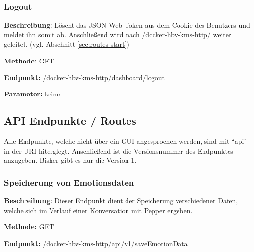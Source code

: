 \subsubsection{Logout}
\label{sec:routes-logout}
\textbf{Beschreibung:} Löscht das JSON Web Token aus dem Cookie des Benutzers und meldet ihn somit ab.
Anschließend wird nach /docker-hbv-kms-http/ weiter geleitet. (vgl. Abschnitt \ref{sec:routes-start})

\textbf{Methode:} GET

\textbf{Endpunkt:} /docker-hbv-kms-http/dashboard/logout

\textbf{Parameter:} keine

\dotfill






\subsection{API Endpunkte / Routes}
\label{sec:api-routes}
Alle Endpunkte, welche nicht über ein GUI angesprochen werden, sind mit ``api' in der URI hiterglegt. Anschließend
ist die Versionsnummer des Endpunktes anzugeben. Bisher gibt es nur die Version 1.

\subsubsection{Speicherung von Emotionsdaten}
\label{sec:api-saveEmotionData}
\textbf{Beschreibung:} Dieser Endpunkt dient der Speicherung verschiedener Daten, welche sich im Verlauf einer
Konversation mit Pepper ergeben.

\textbf{Methode:} GET

\textbf{Endpunkt:} /docker-hbv-kms-http/api/v1/saveEmotionData

